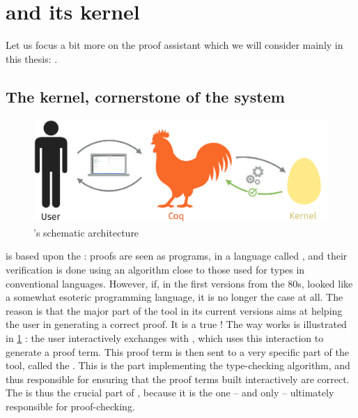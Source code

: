 \section{ and its kernel}
\label{sec:intro-coq-en}

Let us focus a bit more on the proof assistant which we will consider mainly in this
thesis: .

\subsection[The kernel]{The kernel, cornerstone of the system}

\begin{figure}[h]

  \centering
  \includegraphics{./figures/coq-kernel-en.pdf}

  \caption{’s schematic architecture}
  \label{fig:coq-en}
\end{figure}

 is based upon the : proofs are seen as programs,
in a language called , and their verification is done using an algorithm
close to those used for types in conventional languages. However, if, in the first versions
from the 80s,  looked like a somewhat esoteric programming language, it is
no longer the case at all. The reason is that the major part of the tool in its
current versions aims at helping the user in generating a correct proof. It is a true
!
The way  works is illustrated in \cref{fig:coq-en} : the user interactively exchanges
with , which uses this interaction to generate a proof term. This proof term is then
sent to a very specific part of the tool, called the .
This is the part implementing the type-checking algorithm, and thus responsible for ensuring
that the proof terms built interactively are correct.
The  is thus the crucial part of , because it is the one – and only –
ultimately responsible for proof-checking.

